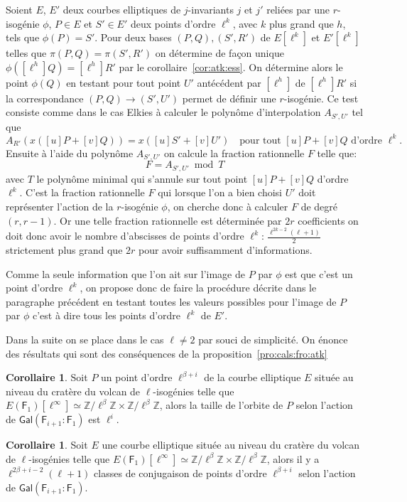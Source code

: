 \documentclass[10pt,a4paper]{book}
\theoremstyle{plain}
\theoremstyle{definition}
\theoremstyle{definition}
\newtheorem{cor}[thm]{Corollaire}
\theoremstyle{definition}
\theoremstyle{definition}
\theoremstyle{remark}
\theoremstyle{remark}
\theoremstyle{definition}
\begin{document}
Soient $E$, $E'$ deux courbes elliptiques de $j$-invariants $j$ et $j'$ reliées
par une $r$-isogénie $\phi$, $P \in E$ et $S' \in E'$ deux points d'ordre 
$\ell^{k}$, avec $k$  plus grand que $h$, tels que $\phi(P)=S'$. Pour deux 
bases $(P,Q),(S',R')$ de $E[\ell^k]$ et $E'[\ell^k]$ telles que $\pi(P,Q)=
\pi(S',R')$ on détermine de façon unique $\phi([\ell^h]Q)=[\ell^h]R'$ par le 
corollaire~\ref{cor:atk:ess}. On détermine alors le point 
$\phi(Q)$ en testant pour tout point $U'$ antécédent par $[\ell^h]$ de 
$[\ell^h]R'$ si la correspondance $(P,Q) \rightarrow (S',U')$ permet de définir
une $r$-isogénie. Ce test consiste comme dans le cas Elkies à calculer le 
polynôme d'interpolation $A_{S',U'}$ tel que 
\[
A_{R'}(x([u]P+[v]Q))=x([u]S'+[v]U') \quad \text{pour tout $[u]P+[v]Q$ d'ordre $\ell^k$}.
\]
Ensuite à l'aide du polynôme $A_{S',U'}$ on calcule la fraction rationnelle $F$ telle que:
\[
F=A_{S',U'} \bmod T
\]
avec $T$ le polynôme minimal qui s'annule sur tout point $[u]P +[v]Q$ 
d'ordre $\ell^k$. C'est la fraction rationnelle $F$ qui lorsque l'on a bien 
choisi $U'$ doit représenter l'action de la $r$-isogénie $\phi$, on cherche 
donc à calculer $F$ de degré $(r,r-1)$. Or une telle fraction rationnelle est 
déterminée par $2r$ coefficients on doit donc avoir le nombre d'abscisses de 
points d'ordre $\ell^k$: $\frac{\ell^{2k-2}(\ell+1)}{2}$ strictement plus grand
que $2r$ pour avoir suffisamment d'informations.

Comme la seule information que l'on ait sur l'image de $P$ par $\phi$ est que 
c'est un point d'ordre $\ell^k$, on propose donc de faire la procédure décrite 
dans le paragraphe précédent en testant toutes les valeurs possibles pour 
l'image de $P$ par $\phi$ c'est à dire tous les points d'ordre $\ell^k$ de 
$E'$.

Dans la suite on se place dans le cas $\ell \neq 2$ par souci de simplicité.
On énonce des résultats qui sont des conséquences de la proposition~\ref{pro:cals:fro:atk}

\begin{cor}
Soit $P$ un point d'ordre $\ell^{\beta+i}$ de la courbe elliptique $E$ située 
au niveau du cratère du volcan de $\ell$-isogénies telle que $E(\mathsf{F}_
{1})[\ell^{\infty}] \simeq \mathbb{Z}/ \ell^{\beta} \mathbb{Z} \times 
\mathbb{Z}/ \ell^{\beta}\mathbb{Z}$, alors la taille de l'orbite de $P$ selon 
l'action de $\mathsf{Gal}(\mathsf{F}_{i+1}:\mathsf{F}_{1})$ est 
$\ell^i$. 
\end{cor}

\begin{cor} \label{cor:atk:orb:rep}
Soit $E$ une courbe elliptique située au niveau du cratère du volcan de 
$\ell$-isogénies telle que $E(\mathsf{F}_1)[\ell^{\infty}] \simeq 
\mathbb{Z}/ \ell^{\beta} \mathbb{Z} \times \mathbb{Z}/ \ell^{\beta}\mathbb{Z}$,
alors il y a $\ell^{2\beta + i -2}(\ell+1)$ classes de conjugaison de points 
d'ordre $\ell^{\beta+i}$ selon l'action de $\mathsf{Gal}(
\mathsf{F}_{i+1}:\mathsf{F}_{1})$.
\end{cor}
\end{document}
